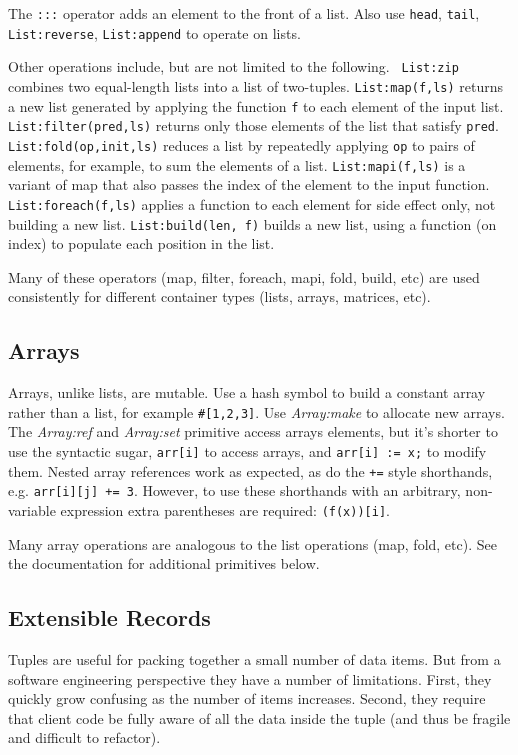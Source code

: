 \documentclass[twocolumn]{report}
\begin{document}
The {\tt :::} operator adds an element to the front of a list.  Also
use {\tt head}, {\tt tail}, {\tt List:reverse}, {\tt List:append} to operate on
lists.  

Other operations include, but are not limited to the following. {\tt
List:zip} combines two equal-length lists into a list of two-tuples.
{\tt List:map(f,ls)} returns a new list generated by applying the
function {\tt f} to each element of the input list.  {\tt
List:filter(pred,ls)} returns only those elements of the list that
satisfy {\tt pred}.  {\tt List:fold(op,init,ls)} reduces a list by
repeatedly applying {\tt op} to pairs of elements, for example, to sum
the elements of a list.  {\tt List:mapi(f,ls)} is a variant of map
that also passes the index of the element to the input function.  {\tt
List:foreach(f,ls)} applies a function to each element for side effect
only, not building a new list.  {\tt List:build(len, f)} builds a new
list, using a function (on index) to populate each position in the
list.

Many of these operators (map, filter, foreach, mapi, fold, build, etc) are used consistently
for different container types (lists, arrays, matrices, etc).

\subsection{Arrays}

Arrays, unlike lists, are mutable. 
Use a hash symbol to build a constant array rather than a list, for
example {{\tt \#[1,2,3]}}.
Use
{\em Array:make} to allocate new arrays.  The {\em Array:ref} and {\em Array:set}
primitive access arrays elements, but it's shorter to use the syntactic
sugar, {\tt arr[i]} to access arrays, and {\tt arr[i] := x;} to modify them.  Nested array references work as
expected, as do the {\tt +=} style shorthands, e.g. {\tt arr[i][j] += 3}.  
However, to use these shorthands with an arbitrary, non-variable
expression extra parentheses are required: {\tt (f(x))[i]}.

Many array operations are analogous to the list operations (map,
fold, etc).  See the documentation for additional primitives below.

\subsection{Extensible Records}
\label{s:records}

Tuples are useful for packing together a small number of data items.
But from a software engineering perspective they have a number of
limitations.  First, they quickly grow confusing as the number of
items increases.  Second, they require that client code be fully aware
of all the data inside the tuple (and thus be fragile and difficult to
refactor).  
\end{document}
